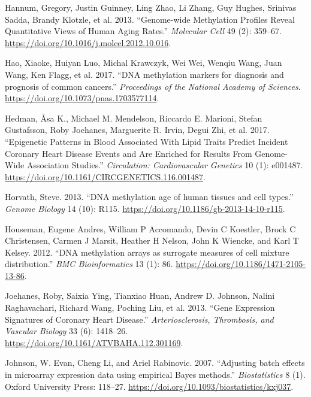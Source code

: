 \documentclass[]{article}
\begin{document}
\leavevmode\hypertarget{ref-Hannum2013}{}%
Hannum, Gregory, Justin Guinney, Ling Zhao, Li Zhang, Guy Hughes,
Srinivas Sadda, Brandy Klotzle, et al. 2013. ``Genome-wide Methylation
Profiles Reveal Quantitative Views of Human Aging Rates.''
\emph{Molecular Cell} 49 (2): 359--67.
\url{https://doi.org/10.1016/j.molcel.2012.10.016}.

\leavevmode\hypertarget{ref-Hao2017}{}%
Hao, Xiaoke, Huiyan Luo, Michal Krawczyk, Wei Wei, Wenqiu Wang, Juan
Wang, Ken Flagg, et al. 2017. ``DNA methylation markers for diagnosis
and prognosis of common cancers.'' \emph{Proceedings of the National
Academy of Sciences}. \url{https://doi.org/10.1073/pnas.1703577114}.

\leavevmode\hypertarget{ref-Hedman2017}{}%
Hedman, Åsa K., Michael M. Mendelson, Riccardo E. Marioni, Stefan
Gustafsson, Roby Joehanes, Marguerite R. Irvin, Degui Zhi, et al. 2017.
``Epigenetic Patterns in Blood Associated With Lipid Traits Predict
Incident Coronary Heart Disease Events and Are Enriched for Results From
Genome-Wide Association Studies.'' \emph{Circulation: Cardiovascular
Genetics} 10 (1): e001487.
\url{https://doi.org/10.1161/CIRCGENETICS.116.001487}.

\leavevmode\hypertarget{ref-Horvath2013}{}%
Horvath, Steve. 2013. ``DNA methylation age of human tissues and cell
types.'' \emph{Genome Biology} 14 (10): R115.
\url{https://doi.org/10.1186/gb-2013-14-10-r115}.

\leavevmode\hypertarget{ref-Houseman2012}{}%
Houseman, Eugene Andres, William P Accomando, Devin C Koestler, Brock C
Christensen, Carmen J Marsit, Heather H Nelson, John K Wiencke, and Karl
T Kelsey. 2012. ``DNA methylation arrays as surrogate measures of cell
mixture distribution.'' \emph{BMC Bioinformatics} 13 (1): 86.
\url{https://doi.org/10.1186/1471-2105-13-86}.

\leavevmode\hypertarget{ref-Joehanes2013}{}%
Joehanes, Roby, Saixia Ying, Tianxiao Huan, Andrew D. Johnson, Nalini
Raghavachari, Richard Wang, Poching Liu, et al. 2013. ``Gene Expression
Signatures of Coronary Heart Disease.'' \emph{Arteriosclerosis,
Thrombosis, and Vascular Biology} 33 (6): 1418--26.
\url{https://doi.org/10.1161/ATVBAHA.112.301169}.

\leavevmode\hypertarget{ref-Johnson2007}{}%
Johnson, W. Evan, Cheng Li, and Ariel Rabinovic. 2007. ``Adjusting batch
effects in microarray expression data using empirical Bayes methods.''
\emph{Biostatistics} 8 (1). Oxford University Press: 118--27.
\url{https://doi.org/10.1093/biostatistics/kxj037}.
\end{document}
